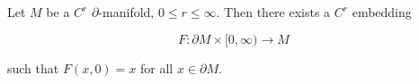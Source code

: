 Let $M$ be a $C^r$ $\partial$-manifold, $0 \leqslant r \leqslant \infty$. Then there exists a $C^r$ embedding

$$F: \partial M \times [0, \infty) \to M$$

such that $F(x, 0) = x$ for all $x \in \partial M$.
